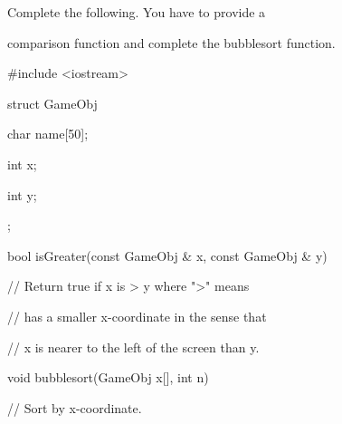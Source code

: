 Complete the following. You have to provide a

comparison function and complete the bubblesort function.



\begin{consolethree}[escapeinside=||]

#include <iostream>



struct GameObj

{

    char name[50];

    int x;

    int y;

};



bool isGreater(const GameObj & x, const GameObj & y)

{

    // Return true if x is > y where ">" means

    // has a smaller x-coordinate in the sense that

    // x is nearer to the left of the screen than y.

}



void bubblesort(GameObj x[], int n)

{

    // Sort by x-coordinate.

}

\end{consolethree}

